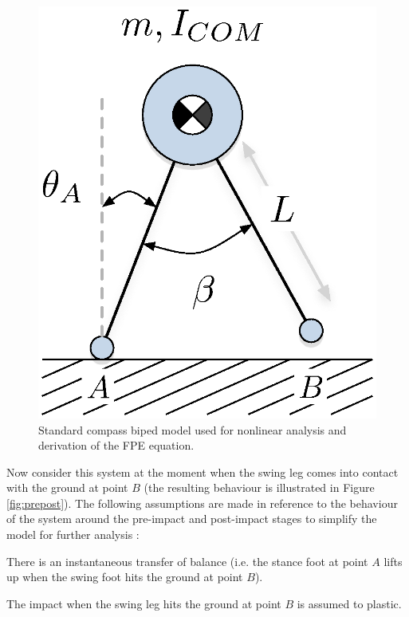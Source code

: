 \begin{figure}[!b]
	\centering
    \includegraphics[scale=0.75]{fig/fpe/compassbiped.eps}
  	\caption{Standard compass biped model used for nonlinear analysis  and derivation of the FPE equation.}
	\label{fig:compass}
\end{figure}

Now consider this system at the moment when the swing leg comes into contact with the ground at point $B$ (the resulting behaviour is illustrated in Figure \ref{fig:prepost}). The following assumptions are made in reference to the behaviour of the system around the pre-impact and post-impact stages to simplify the model for further analysis \cite{Wight:2008vt}: 

\hrulefill

\begin{assumption}
	There is an instantaneous transfer of balance (i.e. the stance foot at point $A$ lifts up when the swing foot hits the ground at point $B$).  
\end{assumption}

\begin{assumption}
	The impact when the swing leg hits the ground at point $B$ is assumed to plastic. 
\end{assumption}

